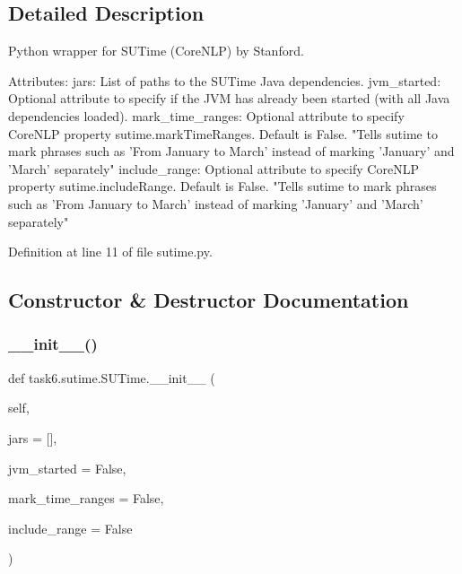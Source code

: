 \subsection{Detailed Description}
\begin{DoxyVerb}Python wrapper for SUTime (CoreNLP) by Stanford.

Attributes:
    jars: List of paths to the SUTime Java dependencies.
    jvm_started: Optional attribute to specify if the JVM has already been
        started (with all Java dependencies loaded).
    mark_time_ranges: Optional attribute to specify CoreNLP property
        sutime.markTimeRanges. Default is False.
        "Tells sutime to mark phrases such as 'From January to March'
        instead of marking 'January' and 'March' separately"
    include_range: Optional attribute to specify CoreNLP property
        sutime.includeRange. Default is False.
        "Tells sutime to mark phrases such as 'From January to March'
        instead of marking 'January' and 'March' separately"
\end{DoxyVerb}
 

Definition at line 11 of file sutime.\+py.



\subsection{Constructor \& Destructor Documentation}
\mbox{\label{classtask6_1_1sutime_1_1SUTime_ad3d2f079441d91580b76c08e8cbbc01c}} 
\subsubsection{\texorpdfstring{\+\_\+\+\_\+init\+\_\+\+\_\+()}{\_\_init\_\_()}}
{\footnotesize\ttfamily def task6.\+sutime.\+S\+U\+Time.\+\_\+\+\_\+init\+\_\+\+\_\+ (\begin{DoxyParamCaption}\item[{}]{self,  }\item[{}]{jars = {\ttfamily \mbox{[}\mbox{]}},  }\item[{}]{jvm\+\_\+started = {\ttfamily False},  }\item[{}]{mark\+\_\+time\+\_\+ranges = {\ttfamily False},  }\item[{}]{include\+\_\+range = {\ttfamily False} }\end{DoxyParamCaption})}

